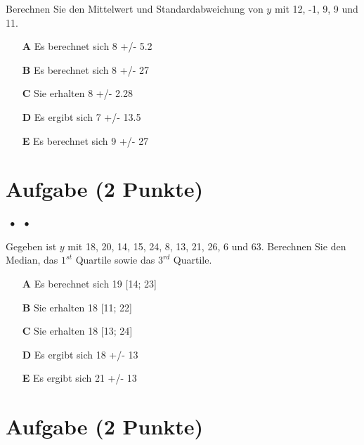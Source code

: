 \documentclass[a4paper, 9pt]{scrartcl}\usepackage[]{graphicx}\usepackage[]{xcolor}
\begin{document}
Berechnen Sie den Mittelwert und Standardabweichung von $y$ mit 12, -1, 9, 9 und 11.



\begin{enumerate}
\item [\textbf{A} \msquare] Es berechnet sich 8 +/- 5.2
\item [\textbf{B} \msquare] Es berechnet sich 8 +/- 27
\item [\textbf{C} \msquare] Sie erhalten 8 +/- 2.28
\item [\textbf{D} \msquare] Es ergibt sich 7 +/- 13.5
\item [\textbf{E} \msquare] Es berechnet sich 9 +/- 27
\end{enumerate} 

\section{Aufgabe \hfill (2 Punkte)}

\ifcollection
\begin{flushright}
\tiny\vspace{-2Ex}
\textbf{\examinhaltstart}
\exammodulemathstat $\;\bullet$
\exammodulestat $\;\bullet$
\exammodulestatbbv 
\vspace{-1Ex}
\end{flushright}
\fi




Gegeben ist $y$ mit 18, 20, 14, 15, 24, 8, 13, 21, 26, 6 und 63. Berechnen Sie den Median, das $1^{st}$ Quartile sowie das $3^{rd}$ Quartile.




\begin{enumerate}
\item [\textbf{A} \msquare] Es berechnet sich 19 [14; 23]
\item [\textbf{B} \msquare] Sie erhalten 18 [11; 22]
\item [\textbf{C} \msquare] Sie erhalten 18 [13; 24]
\item [\textbf{D} \msquare] Es ergibt sich 18 +/- 13
\item [\textbf{E} \msquare] Es ergibt sich 21 +/- 13
\end{enumerate} 

\section{Aufgabe \hfill (2 Punkte)}
\end{document}
